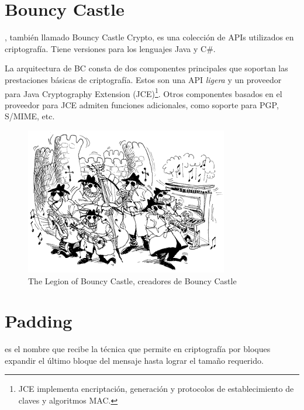 
 \section{Bouncy Castle}

 , también llamado Bouncy Castle Crypto, es una colección de APIs utilizados en criptografía. Tiene versiones para los lenguajes Java y C\#.

 La arquitectura de BC consta de dos componentes principales que soportan las prestaciones básicas de criptografía.
 Estos son una API \emph{ligera} y un proveedor para Java Cryptography Extension (JCE)\footnote{JCE implementa encriptación, generación y protocolos de establecimiento de claves y algoritmos MAC.}.
 Otros componentes basados en el proveedor para JCE admiten funciones adicionales, como soporte para PGP, S/MIME, etc. \emph{\parencite{Reference4}}

 \begin{figure}[ht]
   \centering
   \includegraphics[scale=0.5]{Figures/BouncyCastle}
   \decoRule
   \caption[Legion of Bouncy Castle]{The Legion of Bouncy Castle, creadores de Bouncy Castle}
   \label{fig:BouncyCastle}
 \end{figure}


 \section{Padding}

  es el nombre que recibe la técnica que permite en criptografía por bloques expandir el último bloque del mensaje hasta lograr el tamaño requerido.

